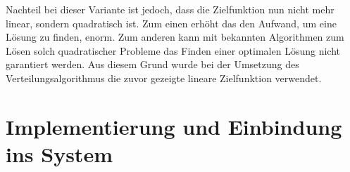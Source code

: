             Nachteil bei dieser Variante ist jedoch, dass die Zielfunktion nun nicht mehr linear, sondern quadratisch ist.
            Zum einen erhöht das den Aufwand, um eine Lösung zu finden, enorm.
            Zum anderen kann mit bekannten Algorithmen zum Lösen solch quadratischer Probleme das Finden einer optimalen Lösung nicht garantiert werden.
            Aus diesem Grund wurde bei der Umsetzung des Verteilungsalgorithmus die zuvor gezeigte lineare Zielfunktion verwendet.
            
    \section{Implementierung und Einbindung ins System}
            
        